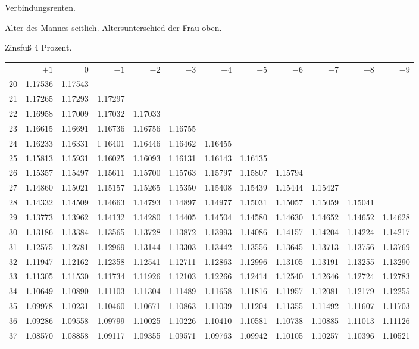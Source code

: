 \clearpage
{}
\begin{center}
Verbindungsrenten.\par\smallskip
Alter des Mannes seitlich. Altersunterschied der Frau oben.\par\smallskip
Zinsfuß \(4\) Prozent.\par\medskip
\fontsize{8}{10}\selectfont\setlength{\tabcolsep}{1.3pt}
\begin{tabular}{|r|rrrrrrrrrrr|}
\hline
&\(+1\)&0&\(-1\)&\(-2\)&\(-3\)&\(-4\)&\(-5\)&\(-6\)&\(-7\)&\(-8\)&\(-9\)\\[8pt]
20&1.17536&1.17543&&&&&&&&&\\
21&1.17265&1.17293&1.17297&&&&&&&&\\
22&1.16958&1.17009&1.17032&1.17033&&&&&&&\\
23&1.16615&1.16691&1.16736&1.16756&1.16755&&&&&&\\
24&1.16233&1.16331&1 16401&1.16446&1.16462&1.16455&&&&&\\[5pt]
25&1.15813&1.15931&1.16025&1.16093&1.16131&1.16143&1.16135&&&&\\
26&1.15357&1.15497&1.15611&1.15700&1.15763&1.15797&1.15807&1.15794&&&\\
27&1.14860&1.15021&1.15157&1.15265&1.15350&1.15408&1.15439&1.15444&1.15427&&\\
28&1.14332&1.14509&1.14663&1.14793&1.14897&1.14977&1.15031&1.15057&1.15059&1.15041&\\
29&1.13773&1.13962&1.14132&1.14280&1.14405&1.14504&1.14580&1.14630&1.14652&1.14652&1.14628\\[5pt]
30&1.13186&1.13384&1.13565&1.13728&1.13872&1.13993&1.14086&1.14157&1.14204&1.14224&1.14217\\
31&1.12575&1.12781&1.12969&1.13144&1.13303&1.13442&1.13556&1.13645&1.13713&1.13756&1.13769\\
32&1.11947&1.12162&1.12358&1.12541&1.12711&1.12863&1.12996&1.13105&1.13191&1.13255&1.13290\\
33&1.11305&1.11530&1.11734&1.11926&1.12103&1.12266&1.12414&1.12540&1.12646&1.12724&1.12783\\
34&1.10649&1.10890&1.11103&1.11304&1.11489&1.11658&1.11816&1.11957&1.12081&1.12179&1.12255\\[5pt]
35&1.09978&1.10231&1.10460&1.10671&1.10863&1.11039&1.11204&1.11355&1.11492&1.11607&1.11703\\
36&1.09286&1.09558&1.09799&1.10025&1.10226&1.10410&1.10581&1.10738&1.10885&1.11013&1.11126\\
37&1.08570&1.08858&1.09117&1.09355&1.09571&1.09763&1.09942&1.10105&1.10257&1.10396&1.10521\\

\end{tabular}
\end{center}
